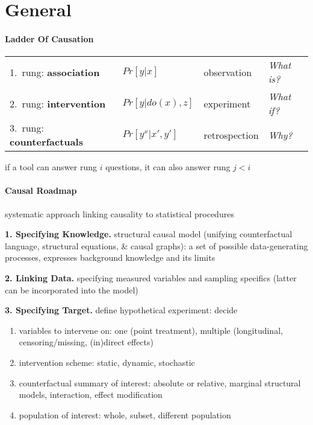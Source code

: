 \documentclass[8pt,twoside]{extarticle}
\begin{document}
\section{General}

\begin{multicols}{2}

\paragraph{Ladder Of Causation} \citep{pearl2019seven}


\begin{minipage}{\textwidth}
\hspace{-0.9em}
\begin{tabular}{l@{\hskip 5pt} l@{\hskip 5pt}l@{\hskip 5pt}l@{\hskip 5pt}}
1.\ rung: \textbf{association} & $Pr\left[y|x\right]$ & observation & \textit{What is?} \\
2.\ rung: \textbf{intervention} & $Pr\left[y|do(x),z\right]$ & experiment & \textit{What if?} \\
3.\ rung: \textbf{counterfactuals} & $Pr\left[y^x|x',y'\right]$ & retrospection & \textit{Why?}
\end{tabular}
\end{minipage}
if a tool can answer rung $i$ questions, it can also answer rung $j<i$


\paragraph{Causal Roadmap} \citep{petersen2014causal} 
systematic approach linking causality to statistical procedures

 \textbf{1. Specifying Knowledge.} structural causal model (unifying counterfactual language, structural equations, \& causal graphs): a set of possible data-generating processes, expresses background knowledge and its limits

 \textbf{2. Linking Data.} specifying measured variables and sampling specifics (latter can be incorporated into the model)

 \textbf{3. Specifying Target.} define hypothetical experiment: decide
\begin{enumerate}[itemsep=0em, topsep=0pt, partopsep=0pt,parsep=0pt]
\setlength{\itemsep}{0pt}%
\setlength{\parskip}{0pt}
\item variables to intervene on: one (point treatment), multiple (longitudinal, censoring/missing, (in)direct effects)
\item intervention scheme: static, dynamic, stochastic
\item counterfactual summary of interest: absolute or relative, marginal structural models, interaction, effect modification
\item population of interest: whole, subset, different population
\end{enumerate}


\end{multicols}
\end{document}

